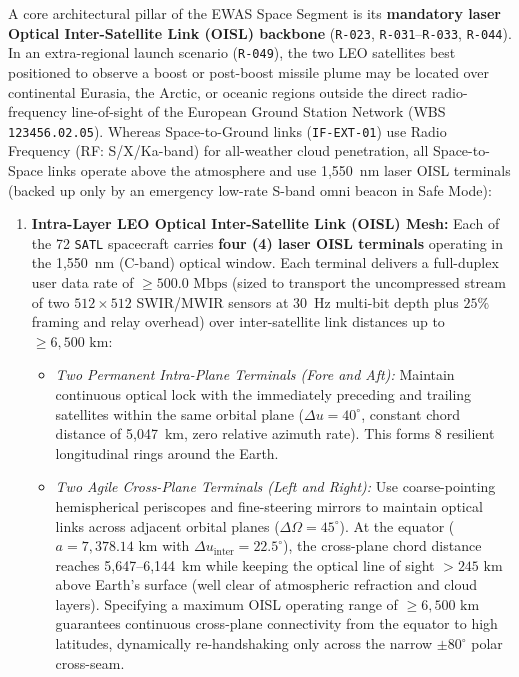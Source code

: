\documentclass[11pt,a4paper]{article}
\providecommand{\abbr}[1]{#1}
\begin{document}
A core architectural pillar of the \abbr{EWAS} Space Segment is its \textbf{mandatory laser Optical Inter-Satellite Link (\abbr{OISL}) backbone} (\texttt{R-023}, \texttt{R-031}--\texttt{R-033}, \texttt{R-044}). In an extra-regional launch scenario (\texttt{R-049}), the two \abbr{LEO} satellites best positioned to observe a boost or post-boost missile plume may be located over continental Eurasia, the Arctic, or oceanic regions outside the direct radio-frequency line-of-sight of the European Ground Station Network (\abbr{WBS} \texttt{123456.02.05}). Whereas Space-to-Ground links (\texttt{IF-EXT-01}) use Radio Frequency (\abbr{RF}: S/X/Ka-band) for all-weather cloud penetration, all Space-to-Space links operate above the atmosphere and use 1,550~nm laser \abbr{OISL} terminals (backed up only by an emergency low-rate S-band omni beacon in Safe Mode):
\begin{enumerate}
    \item \textbf{Intra-Layer \abbr{LEO} Optical Inter-Satellite Link (\abbr{OISL}) Mesh:} Each of the 72 \texttt{SATL} spacecraft carries \textbf{four (4) laser \abbr{OISL} terminals} operating in the 1,550~nm (C-band) optical window. Each terminal delivers a full-duplex user data rate of \textbf{$\ge 500.0\text{ Mbps}$} (sized to transport the uncompressed stream of two $512 \times 512$ \abbr{SWIR}/\abbr{MWIR} sensors at 30~Hz multi-bit depth plus $25\%$ framing and relay overhead) over inter-satellite link distances up to \textbf{$\ge 6{,}500\text{ km}$}:
    \begin{itemize}
        \item \emph{Two Permanent Intra-Plane Terminals (Fore and Aft):} Maintain continuous optical lock with the immediately preceding and trailing satellites within the same orbital plane ($\Delta u = 40^\circ$, constant chord distance of 5,047~km, zero relative azimuth rate). This forms 8 resilient longitudinal rings around the Earth.
        \item \emph{Two Agile Cross-Plane Terminals (Left and Right):} Use coarse-pointing hemispherical periscopes and fine-steering mirrors to maintain optical links across adjacent orbital planes ($\Delta\Omega = 45^\circ$). At the equator ($a = 7{,}378.14\text{ km}$ with $\Delta u_{\text{inter}} = 22.5^\circ$), the cross-plane chord distance reaches 5,647--6,144~km while keeping the optical line of sight $> 245\text{ km}$ above Earth's surface (well clear of atmospheric refraction and cloud layers). Specifying a maximum \abbr{OISL} operating range of $\ge 6{,}500\text{ km}$ guarantees continuous cross-plane connectivity from the equator to high latitudes, dynamically re-handshaking only across the narrow $\pm 80^\circ$ polar cross-seam.

\end{itemize}
\end{enumerate}
\end{document}
